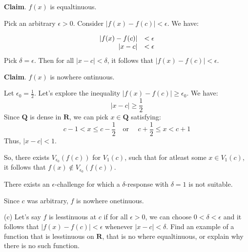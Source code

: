 \documentclass[10pt]{article}
\begin{document}
\textbf{Claim}. $\displaystyle f( x)$ is equaltinuous.

Pick an arbitrary $\displaystyle \epsilon  >0$. Consider $\displaystyle |f( x) -f( c) |< \epsilon $. We have:


\begin{equation*}
\begin{array}{ r l }
|f( x) -f( c) | & < \epsilon \\
|x-c| & < \epsilon 
\end{array}
\end{equation*}
Pick $\displaystyle \delta =\epsilon $. Then for all $\displaystyle |x-c|< \delta $, it follows that $\displaystyle |f( x) -f( c) |< \epsilon $. 



\textbf{Claim}. $\displaystyle f( x)$ is nowhere ontinuous.

Let $\displaystyle \epsilon _{0} =\frac{1}{2}$. Let's explore the inequality $\displaystyle |f( x) -f( c) |\geq \epsilon _{0}$. We have:
\begin{equation*}
|x-c|\geq \frac{1}{2}
\end{equation*}
Since $\displaystyle \mathbf{Q}$ is dense in $\displaystyle \mathbf{R}$, we can pick $\displaystyle x\in \mathbf{Q}$ satisfying:
\begin{equation*}
c-1< x\leq c-\frac{1}{2} \quad \text{or } \quad c+\frac{1}{2} \leq x< c+1
\end{equation*}
Thus, $\displaystyle |x-c|< 1$.



So, there exists $\displaystyle V_{\epsilon _{0}}( f( c))$ for $\displaystyle V_{1}( c)$, such that for atleast some $\displaystyle x\in V_{1}( c)$, it follows that $\displaystyle f( x) \notin V_{\epsilon _{0}}( f( c))$. 



There exists an $\displaystyle \epsilon $-challenge for which a $\displaystyle \delta $-response with $\displaystyle \delta =1$ is not suitable.



Since $\displaystyle c$ was arbitrary, $\displaystyle f$ is nowhere onetinuous.



(c) Let's say $\displaystyle f$ is lesstinuous at $\displaystyle c$ if for all $\displaystyle \epsilon  >0$, we can choose $\displaystyle 0< \delta < \epsilon $ and it follows that $\displaystyle |f( x) -f( c) |< \epsilon $ whenever $\displaystyle |x-c|< \delta $. Find an example of a function that is lesstinuous on $\displaystyle \mathbf{R}$, that is no where equaltinuous, or explain why there is no such function.
\end{document}
